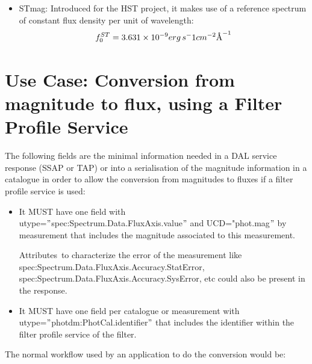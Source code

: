 \documentclass[11pt,a4paper]{ivoa}
\newcommand{\angstrom}{\mbox{\normalfont\AA}}
\begin{document}
\begin{itemize}
	\item{STmag: Introduced for the HST project, it makes use of a reference spectrum of
	constant flux density per unit of wavelength:
\begin{equation} \label{eq:32}
f_0^{ST} = 3.631 \times 10^{-9} erg\, s^-1 cm^{-2} \angstrom ^{-1}
\end{equation}}

\end{itemize}
\section{Use Case: Conversion from magnitude to flux, using a Filter Profile Service}
The following fields are the minimal information needed in a DAL service response (SSAP
or TAP) or into a serialisation of the magnitude information in a catalogue in order to
allow the conversion from magnitudes to fluxes if a filter profile service is used:
\par

\begin{itemize}
	\item{It MUST have one field with\\ utype=$"$spec:Spectrum.Data.FluxAxis.value$"$
	and UCD="phot.mag$"$  by measurement that includes the magnitude associated to
	this measurement. \par}

Attributes\ to characterize the error of the measurement like\\
spec:Spectrum.Data.FluxAxis.Accuracy.StatError,\\
spec:Spectrum.Data.FluxAxis.Accuracy.SysError, etc could also be present
in the response.
\par

	\item{It MUST have one field per catalogue or measurement
	with\\ utype=$"$photdm:PhotCal.identifier$"$  that includes the identifier within the
	filter profile service of the filter.}
\end{itemize}\par

The normal workflow used by an application to do the conversion would be:
\par
\end{document}
